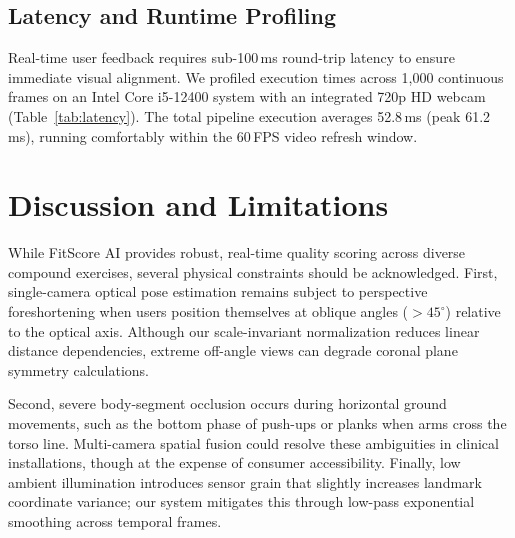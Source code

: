 \documentclass[conference]{IEEEtran}
\begin{document}
\subsection{Latency and Runtime Profiling}
Real-time user feedback requires sub-100\,ms round-trip latency to ensure immediate visual alignment. We profiled execution times across 1,000 continuous frames on an Intel Core i5-12400 system with an integrated 720p HD webcam (Table~\ref{tab:latency}). The total pipeline execution averages 52.8\,ms (peak 61.2\,ms), running comfortably within the $60$\,FPS video refresh window.

\begin{table}[!t]
\caption{Latency Breakdown of Pipeline Stages}
\label{tab:latency}
\centering
{}
\end{table}

\section{Discussion and Limitations}

While FitScore AI provides robust, real-time quality scoring across diverse compound exercises, several physical constraints should be acknowledged. First, single-camera optical pose estimation remains subject to perspective foreshortening when users position themselves at oblique angles ($>45^\circ$) relative to the optical axis. Although our scale-invariant normalization reduces linear distance dependencies, extreme off-angle views can degrade coronal plane symmetry calculations. 

Second, severe body-segment occlusion occurs during horizontal ground movements, such as the bottom phase of push-ups or planks when arms cross the torso line. Multi-camera spatial fusion could resolve these ambiguities in clinical installations, though at the expense of consumer accessibility. Finally, low ambient illumination introduces sensor grain that slightly increases landmark coordinate variance; our system mitigates this through low-pass exponential smoothing across temporal frames.
\end{document}
